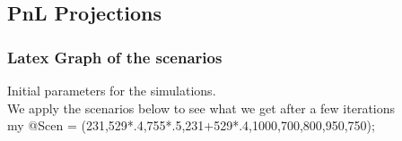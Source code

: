 \documentclass[8pt]{article} %
\begin{document}
\subsection{PnL Projections}


\subsubsection{Latex Graph of the scenarios}

Initial parameters for the simulations.\\


We apply the scenarios below to see what we get after a few iterations\\


my @Scen = (231,529*.4,755*.5,231+529*.4,1000,700,800,950,750);\\
\end{document}
